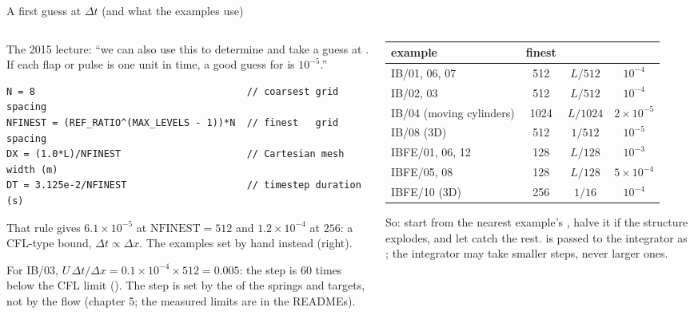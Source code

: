 \documentclass[aspectratio=169,11pt]{beamer}
\begin{document}
\begin{frame}[fragile]{A first guess at $\Delta t$ (and what the examples use)}
\label{fr:dt}
\begin{columns}[T,onlytextwidth]
\begin{column}{0.5\textwidth}
\footnotesize The 2015 lecture: ``we can also use this to determine  and take a guess at . If each flap or pulse is one unit in time, a good guess for  is $10^{-5}$.''
\begin{lstlisting}[style=inputtiny]
N = 8                                     // coarsest grid spacing
NFINEST = (REF_RATIO^(MAX_LEVELS - 1))*N  // finest   grid spacing
DX = (1.0*L)/NFINEST                      // Cartesian mesh width (m)
DT = 3.125e-2/NFINEST                     // timestep duration (s)
\end{lstlisting}
\footnotesize That rule gives $6.1\times10^{-5}$ at $\mathrm{NFINEST} = 512$ and $1.2\times10^{-4}$ at $256$: a CFL-type bound, $\Delta t \propto \Delta x$. The examples set  by hand instead (right).
\vspace{1mm}

\footnotesize For IB/03, $U\,\Delta t/\Delta x = 0.1 \times 10^{-4} \times 512 = 0.005$: the step is 60 times below the CFL limit (). The step is set by the  of the springs and targets, not by the flow (chapter 5; the measured limits are in the READMEs).
\end{column}
\begin{column}{0.48\textwidth}
\scriptsize
\begin{tabular}{@{}L{0.42\textwidth}ccc@{}}
\toprule
example & finest &  & \\
\midrule
IB/01, 06, 07 & 512 & $L/512$ & $10^{-4}$\\
IB/02, 03 & 512 & $L/512$ & $10^{-4}$\\
IB/04 (moving cylinders) & 1024 & $L/1024$ & $2\times10^{-5}$\\
IB/08 (3D) & 512 & $1/512$ & $10^{-5}$\\
IBFE/01, 06, 12 & 128 & $L/128$ & $10^{-3}$\\
IBFE/05, 08 & 128 & $L/128$ & $5\times10^{-4}$\\
IBFE/10 (3D) & 256 & $1/16$ & $10^{-4}$\\
\bottomrule
\end{tabular}

\vspace{2mm}

\footnotesize So: start from the nearest example's , halve it if the structure explodes, and let  catch the rest.  is passed to the integrator as ; the integrator may take smaller steps, never larger ones.
\end{column}
\end{columns}
\end{frame}
\end{document}
